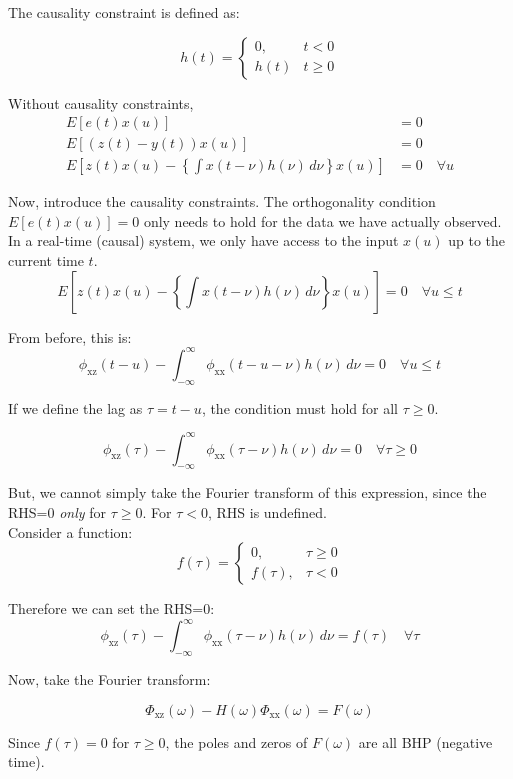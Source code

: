 \documentclass[12pt]{book}
\theoremstyle{definition}
\begin{document}
The causality constraint is defined as:

\[
h(t) = \begin{cases}
    0, & t<0 \\
    h(t) & t\ge 0
\end{cases}
\]

Without causality constraints, 
\[
\begin{aligned}
    E[e(t) x(u)] & = 0\\
    E[(z(t)-y(t))x(u)] & = 0 \\
    E \left [z(t)x(u) - \left \{ \int x(t-\nu)h(\nu) \, d \nu \right \} x(u) \right ] & = 0 \quad \forall u
\end{aligned}
\]

Now, introduce the causality constraints. The orthogonality condition $E[e(t)x(u)] = 0$ only needs to hold for the data we have actually observed. In a real-time (causal) system, we only have access to the input $x(u)$ up to the current time $t$. 
\[
 E \left [z(t)x(u) - \left \{ \int x(t-\nu)h(\nu) \, d \nu \right \} x(u) \right ] = 0 \quad \forall u \le t
\]


From before, this is:
\[
\phi_\mathrm{xz} (t-u) - \int_{-\infty}^{\infty}\phi_\mathrm{xx}(t-u-\nu)h(\nu) \, d \nu = 0 \quad \forall u \le t 
\]

If we define the lag as $\tau = t - u$, the condition must hold for all $\tau \ge 0$.

\[
\phi_\mathrm{xz} (\tau) - \int_{-\infty}^{\infty}\phi_\mathrm{xx}(\tau-\nu)h(\nu) \, d \nu = 0 \quad \forall \tau \ge 0 
\]

But, we cannot simply take the Fourier transform of this expression, since the RHS=0 \emph{only} for \(\tau \ge 0\). For \(\tau < 0\), RHS is undefined.\\

Consider a function:
\[
f(\tau) = 
\begin{cases}
    0, & \tau \ge 0 \\
    f(\tau), & \tau < 0
\end{cases}
\]

Therefore we can set the RHS=0:
\[
\phi_\mathrm{xz} (\tau) - \int_{-\infty}^{\infty}\phi_\mathrm{xx}(\tau-\nu)h(\nu) \, d \nu = f(\tau) \quad \forall \tau  
\]

Now, take the Fourier transform:

\[
\Phi_\mathrm{xz}(\omega) - H(\omega)\Phi_\mathrm{xx}(\omega) = F(\omega)
\]

Since \(f(\tau)=0\) for \(\tau \ge 0\), the poles and zeros of \(F(\omega)\) are all BHP (negative time).\\
\end{document}
